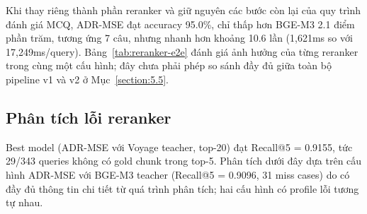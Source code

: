 \documentclass[../DoAn.tex]{subfiles}
\begin{document}
\begin{table}[H]
    \centering
    \caption{Đánh giá end-to-end các reranker trên 343 câu hỏi trắc nghiệm}
    \label{tab:reranker-e2e}
    {\small
    \setlength{\tabcolsep}{5pt}
    }
\end{table}

Khi thay riêng thành phần reranker và giữ nguyên các bước còn lại của quy trình đánh giá MCQ, ADR-MSE đạt accuracy 95.0\%, chỉ thấp hơn BGE-M3 2.1 điểm phần trăm, tương ứng 7 câu, nhưng nhanh hơn khoảng 10.6 lần (1,621ms so với 17,249ms/query). Bảng~\ref{tab:reranker-e2e} đánh giá ảnh hưởng của từng reranker trong cùng một cấu hình; đây chưa phải phép so sánh đầy đủ giữa toàn bộ pipeline v1 và v2 ở Mục~\ref{section:5.5}.

\subsection{Phân tích lỗi reranker}
\label{subsection:5.2.5}

Best model (ADR-MSE với Voyage teacher, top-20) đạt Recall@5 = 0.9155, tức 29/343 queries không có gold chunk trong top-5. Phân tích dưới đây dựa trên cấu hình ADR-MSE với BGE-M3 teacher (Recall@5 = 0.9096, 31 miss cases) do có đầy đủ thông tin chi tiết từ quá trình phân tích; hai cấu hình có profile lỗi tương tự nhau.
\end{document}
